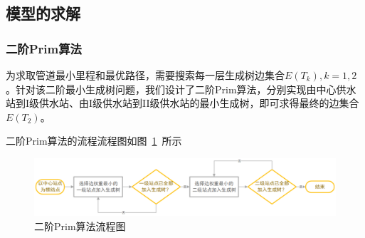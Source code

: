 \documentclass{whutmod}
\begin{document}
		\subsection{模型的求解}
			\subsubsection{二阶Prim算法}
		为求取管道最小里程和最优路径，需要搜索每一层生成树边集合$E(T_k),k=1,2$。针对该二阶最小生成树问题，我们设计了二阶Prim算法，分别实现由中心供水站到I级供水站、由I级供水站到II级供水站的最小生成树，即可求得最终的边集合$E(T_2)$。
		
		二阶Prim算法的流程流程图如图~\ref{asd}~所示
		\begin{figure}[H]
		\centering
		\includegraphics[width=\textwidth]{figures/a1.png}
		\caption{二阶Prim算法流程图}\label{asd}
	\end{figure}
		
\end{document}

